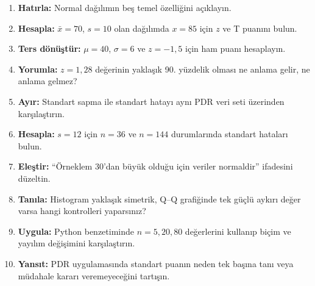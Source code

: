 \begin{enumerate}
\renewcommand{\labelenumi}{\textbf{\Alph{enumi}.}}
  \item \textbf{Hatırla:} Normal dağılımın beş temel özelliğini açıklayın.
  \item \textbf{Hesapla:} $\bar x=70$, $s=10$ olan dağılımda $x=85$ için $z$ ve T puanını bulun.
  \item \textbf{Ters dönüştür:} $\mu=40$, $\sigma=6$ ve $z=-1{,}5$ için ham puanı hesaplayın.
  \item \textbf{Yorumla:} $z=1{,}28$ değerinin yaklaşık 90. yüzdelik olması ne anlama gelir, ne anlama gelmez?
  \item \textbf{Ayır:} Standart sapma ile standart hatayı aynı PDR veri seti üzerinden karşılaştırın.
  \item \textbf{Hesapla:} $s=12$ için $n=36$ ve $n=144$ durumlarında standart hataları bulun.
  \item \textbf{Eleştir:} ``Örneklem 30'dan büyük olduğu için veriler normaldir'' ifadesini düzeltin.
  \item \textbf{Tanıla:} Histogram yaklaşık simetrik, Q--Q grafiğinde tek güçlü aykırı değer varsa hangi kontrolleri yaparsınız?
  \item \textbf{Uygula:} Python benzetiminde $n=5,20,80$ değerlerini kullanıp biçim ve yayılım değişimini karşılaştırın.
  \item \textbf{Yansıt:} PDR uygulamasında standart puanın neden tek başına tanı veya müdahale kararı veremeyeceğini tartışın.
\end{enumerate}

